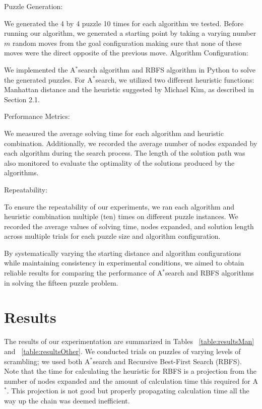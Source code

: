 \documentclass{article}
\begin{document}
{Puzzle Generation:}

We generated the 4 by 4 puzzle 10 times for each algorithm we tested. Before running our algorithm, we generated a starting point by taking a varying number $m$ random moves from the goal configuration making sure that none of these moves were the direct opposite of the previous move. 
Algorithm Configuration:

We implemented the A$^*$search algorithm and RBFS algorithm in Python to solve the generated puzzles.
For A$^*$search, we utilized two different heuristic functions: Manhattan distance and the heuristic suggested by Michael Kim, as described in Section 2.1.

Performance Metrics:

We measured the average solving time for each algorithm and heuristic combination.
Additionally, we recorded the average number of nodes expanded by each algorithm during the search process.
The length of the solution path was also monitored to evaluate the optimality of the solutions produced by the algorithms.

Repeatability:

To ensure the repeatability of our experiments, we ran each algorithm and heuristic combination multiple (ten) times on different puzzle instances.
We recorded the average values of solving time, nodes expanded, and solution length across multiple trials for each puzzle size and algorithm configuration.
 
By systematically varying the starting distance and algorithm configurations while maintaining consistency in experimental conditions, we aimed to obtain reliable results for comparing the performance of A$^*$search and RBFS algorithms in solving the fifteen puzzle problem.

\section{Results}
The results of our experimentation are summarized in Tables ~\ref{table:resultsMan} and ~\ref{table:resultsOther}. We conducted trials on puzzles of varying levels of scrambling; we used both A$^*$search and Recursive Best-First Search (RBFS). Note that the time for calculating the heuristic for RBFS is a projection from the number of nodes expanded and the amount of calculation time this required for A$^*$. This projection is not good but properly propagating calculation time all the way up the chain was deemed inefficient. 
\end{document}
